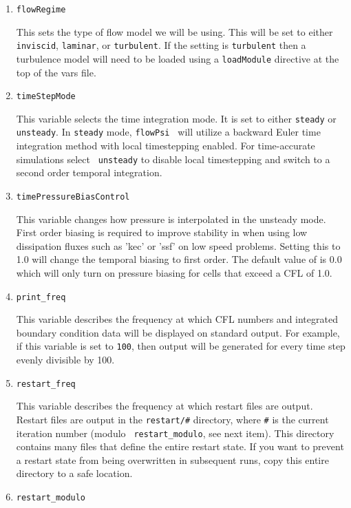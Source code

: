 \documentclass{article}
\begin{document}
\begin{enumerate}
\item {\tt flowRegime }

This sets the type of flow model we will be using.  This will be set
to either {\tt inviscid}, {\tt laminar}, or {\tt turbulent}.  If the
setting is {\tt turbulent} then a turbulence model will need to be
loaded using a {\tt loadModule} directive at the top of the vars file.  

\item {\tt timeStepMode }

This variable selects the time integration mode.  It is set to either
{\tt steady} or {\tt unsteady}.  In {\tt steady} mode, {\tt flowPsi }
will utilize a backward Euler time integration method with local
timestepping enabled.  For time-accurate simulations select {\tt
  unsteady} to disable local timestepping and switch to a second order
temporal integration.

\item {\tt timePressureBiasControl}

This variable changes how pressure is interpolated in the unsteady
mode.  First order biasing is required to improve stability in when
using low dissipation fluxes such as 'kec' or 'ssf' on low speed
problems.  Setting this to 1.0 will change the temporal biasing to
first order.  The default value of is 0.0 which will only turn on
pressure biasing for cells that exceed a CFL of 1.0.

\item {\tt print\_freq}

  This variable describes the frequency at which CFL numbers and integrated
  boundary condition data will be displayed on standard output.  For
  example, if this variable is set to {\tt 100}, then output will be
  generated for every time step evenly divisible by 100.
  
\item {\tt restart\_freq} 

  This variable describes the frequency at which restart files are output.
  Restart files are output in the {\tt restart/\#} directory, where
  {\tt \#} is the current iteration number (modulo {\tt
    restart\_modulo}, see next item).  This directory contains many
  files that define the entire restart state.  If you want to prevent a
  restart state from being overwritten in subsequent runs, copy this
  entire directory to a safe location.  

\item {\tt restart\_modulo} 


\end{enumerate}
\end{document}
